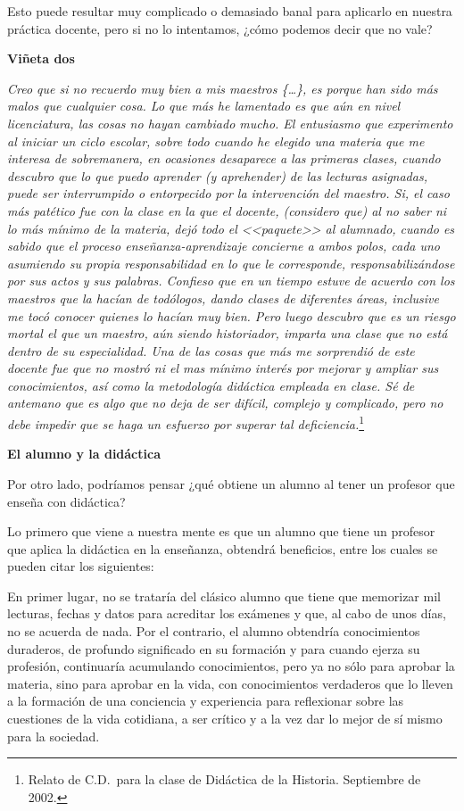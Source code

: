 Esto puede resultar muy complicado o demasiado banal para aplicarlo en 
nuestra práctica docente, pero si no lo intentamos, ¿cómo podemos decir 
que no vale?


{\bfseries Viñeta dos}

\enlargethispage{1\baselineskip}
\textit{Creo que si no recuerdo muy bien a mis maestros \{\ldots\}, es 
porque han sido más malos que cualquier cosa. Lo que más he lamentado 
es que aún en nivel licenciatura, las cosas no hayan cambiado mucho. El 
entusiasmo que experimento al iniciar un ciclo escolar, sobre todo 
cuando he elegido una materia que me interesa de sobremanera, en 
ocasiones desaparece a las primeras clases, cuando descubro que lo que 
puedo aprender (y aprehender) de las lecturas asignadas, puede ser 
interrumpido o entorpecido por la intervención del maestro. Si, el caso 
más patético fue con la clase en la que el docente, (considero que) al 
no saber ni lo más mínimo de la materia, dejó todo el <<paquete>> al 
alumnado, cuando es sabido que el proceso 
enseñanza-aprendizaje concierne a ambos polos, cada uno asumiendo su 
propia responsabilidad en lo que le corresponde, responsabilizándose 
por sus actos y sus palabras. Confieso que en un tiempo estuve de 
acuerdo con los maestros que la hacían de todólogos, dando clases de 
diferentes áreas, inclusive me tocó conocer quienes lo hacían muy bien. 
Pero luego descubro que es un riesgo mortal el que un maestro, aún 
siendo historiador, imparta una clase que no está dentro de su 
especialidad. Una de las cosas que más me sorprendió de este docente 
fue que no mostró ni el mas mínimo interés por mejorar y ampliar sus 
conocimientos, así como la metodología didáctica empleada en clase. Sé 
de antemano que es algo que no deja de ser difícil, complejo y 
complicado, pero no debe impedir que se haga un esfuerzo por superar 
tal deficiencia.}\footnote{Relato de C.D.\ para la clase de Didáctica 
de la Historia. Septiembre de 2002.}


\medskip 
\textbf{El alumno y la didáctica}
 
Por otro lado, podríamos pensar ¿qué obtiene un alumno al tener un 
profesor que enseña con didáctica?

 
Lo primero  que viene a nuestra mente es que un alumno que tiene un 
profesor que aplica la didáctica en la enseñanza, obtendrá beneficios, 
entre los cuales se pueden citar los siguientes:

 
En primer lugar, no se trataría del clásico alumno que tiene que 
memorizar mil lecturas, fechas y datos para acreditar los exámenes y 
que, al cabo de unos días, no se acuerda de nada. Por el contrario, el 
alumno obtendría conocimientos duraderos, de profundo significado en su 
formación y para cuando ejerza su profesión, continuaría acumulando 
conocimientos, pero ya no sólo para aprobar la materia, sino para 
aprobar en la vida, con conocimientos verdaderos que lo lleven a la 
formación de una conciencia y experiencia para reflexionar sobre las 
cuestiones de la vida cotidiana, a ser crítico y a la vez dar lo mejor 
de sí mismo para la sociedad.

